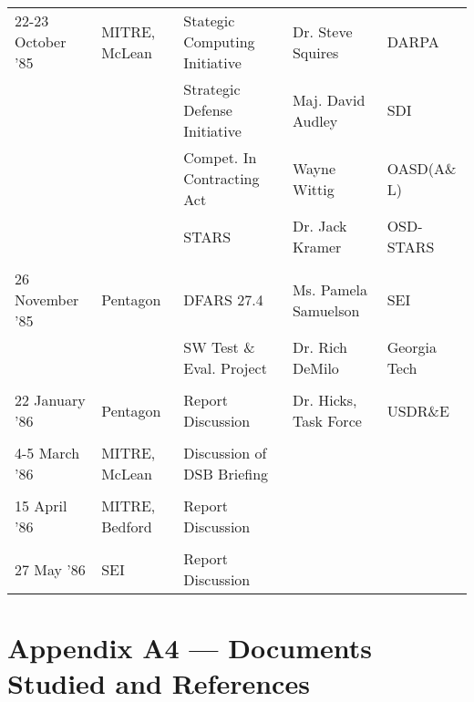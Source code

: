 \documentclass[11pt,final]{article}
\begin{document}
\begin{scriptsize}
\begin{tabular}{ l l l l l }
\\
22-23 October ’85 & MITRE, McLean & Stategic Computing Initiative & Dr. Steve Squires & DARPA\\
 & & Strategic Defense Initiative  & Maj. David Audley & SDI\\
 & & Compet. In Contracting Act    & Wayne Wittig      & OASD(A\& L)   \\
 & & STARS                         & Dr. Jack Kramer   & OSD-STARS      \\
\\
26 November ’85 & Pentagon    & DFARS 27.4                & Ms. Pamela Samuelson & SEI           \\
                         & &  SW Test \& Eval. Project  & Dr. Rich DeMilo      & Georgia Tech      \\
\\
22 January ’86 & Pentagon & Report Discussion & Dr. Hicks, Task Force & USDR\&E\\
\\
    4-5 March ’86 & MITRE, McLean & Discussion of DSB Briefing\\
\\
    15 April ’86 & MITRE, Bedford & Report Discussion\\
\\
    27 May ’86 & SEI & Report Discussion\\
\end{tabular}
\end{scriptsize}


\newpage

\section*{Appendix A4 — Documents Studied and References}
\end{document}

